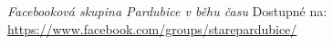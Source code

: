 \begin{thebibliography}{99}
     \textit{Facebooková skupina Pardubice v běhu času} Dostupné na: \url{https://www.facebook.com/groups/starepardubice/}
\end{thebibliography}
